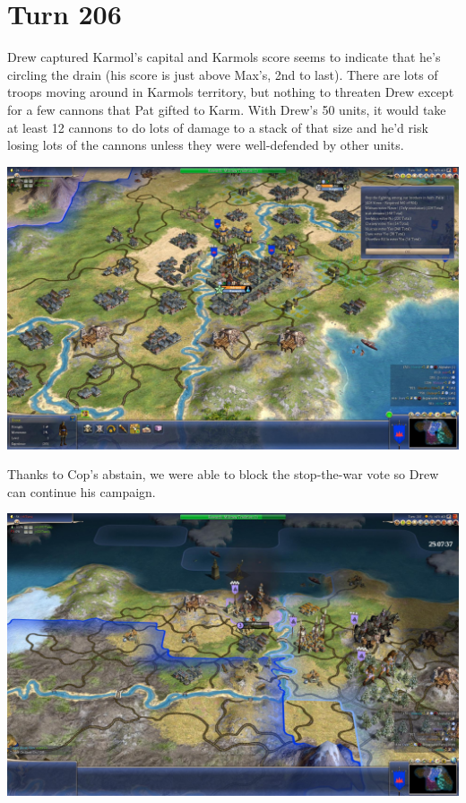 \documentclass[10pt]{article}
\begin{document}
\section*{Turn 206}

Drew captured Karmol's capital and Karmols score seems to indicate
that he's circling the drain (his score is just above Max's, 2nd to
last). There are lots of troops moving around in Karmols territory,
but nothing to threaten Drew except for a few cannons that Pat gifted
to Karm. With Drew's 50 units, it would take at least 12 cannons to do
lots of damage to a stack of that size and he'd risk losing lots of
the cannons unless they were well-defended by other units.

\includegraphics[width=1.0\textwidth]{turn207}

Thanks to Cop's abstain, we were able to block the stop-the-war
vote so Drew can continue his campaign.

\includegraphics[width=1.0\textwidth]{turn207-2}
\end{document}
